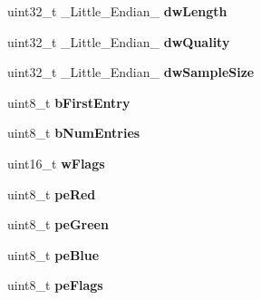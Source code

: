 \begin{DoxyCompactItemize}
\item 
\hypertarget{structGCC__ATTRIBUTE_aabd09d393d0ec256c4d083abc39ba638}{uint32\-\_\-t \-\_\-\-Little\-\_\-\-Endian\-\_\- {\bfseries dw\-Length}}\label{structGCC__ATTRIBUTE_aabd09d393d0ec256c4d083abc39ba638}

\item 
\hypertarget{structGCC__ATTRIBUTE_ae74300be9da65b35a1e5b052b6beb21e}{uint32\-\_\-t \-\_\-\-Little\-\_\-\-Endian\-\_\- {\bfseries dw\-Quality}}\label{structGCC__ATTRIBUTE_ae74300be9da65b35a1e5b052b6beb21e}

\item 
\hypertarget{structGCC__ATTRIBUTE_aa6eeaa606b4696ba73e60fecea519ee0}{uint32\-\_\-t \-\_\-\-Little\-\_\-\-Endian\-\_\- {\bfseries dw\-Sample\-Size}}\label{structGCC__ATTRIBUTE_aa6eeaa606b4696ba73e60fecea519ee0}

\item 
\hypertarget{structGCC__ATTRIBUTE_a945faa9ae40aa514926cdfbfc485b024}{uint8\-\_\-t {\bfseries b\-First\-Entry}}\label{structGCC__ATTRIBUTE_a945faa9ae40aa514926cdfbfc485b024}

\item 
\hypertarget{structGCC__ATTRIBUTE_a4041650446337dcdd670c1cc371a2db0}{uint8\-\_\-t {\bfseries b\-Num\-Entries}}\label{structGCC__ATTRIBUTE_a4041650446337dcdd670c1cc371a2db0}

\item 
\hypertarget{structGCC__ATTRIBUTE_aacd0770b45a2810313ca604758bcb7e5}{uint16\-\_\-t {\bfseries w\-Flags}}\label{structGCC__ATTRIBUTE_aacd0770b45a2810313ca604758bcb7e5}

\item 
\hypertarget{structGCC__ATTRIBUTE_a19b5ebf3379bac01ecd7ec545ea0fd50}{uint8\-\_\-t {\bfseries pe\-Red}}\label{structGCC__ATTRIBUTE_a19b5ebf3379bac01ecd7ec545ea0fd50}

\item 
\hypertarget{structGCC__ATTRIBUTE_a752b03730e640f90e8741b50caaf4865}{uint8\-\_\-t {\bfseries pe\-Green}}\label{structGCC__ATTRIBUTE_a752b03730e640f90e8741b50caaf4865}

\item 
\hypertarget{structGCC__ATTRIBUTE_a1f0a7f899f4b902287d3e59ba6fec358}{uint8\-\_\-t {\bfseries pe\-Blue}}\label{structGCC__ATTRIBUTE_a1f0a7f899f4b902287d3e59ba6fec358}

\item 
\hypertarget{structGCC__ATTRIBUTE_a6b03abfd8246258ce50c0af70390ad70}{uint8\-\_\-t {\bfseries pe\-Flags}}\label{structGCC__ATTRIBUTE_a6b03abfd8246258ce50c0af70390ad70}


\end{DoxyCompactItemize}
